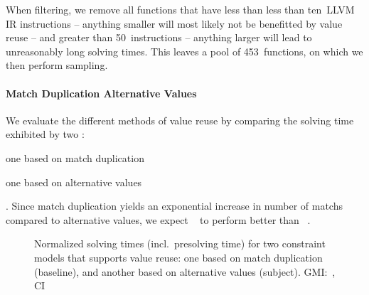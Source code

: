 When filtering, we remove all \glspl{function} that have less than less
than ten~\gls{LLVM} \gls{IR} \glspl{instruction} -- anything smaller will most
likely not be benefitted by \gls{value reuse} -- and greater than
\num{50}~\glspl{instruction} -- anything larger will lead to unreasonably long
solving times.
%
This leaves a pool of \num{453}~\glspl{function}, on which we then perform
sampling.


\paragraph{Match Duplication \versus Alternative Values}

We evaluate the different methods of \gls{value reuse} by comparing the solving
time exhibited by two :
%
\begin{modelList}
  \item {}
    one based on \gls{match duplication}
  \item {}
    one based on \glspl{alternative value}
\end{modelList}.
%
Since \gls{match duplication} yields an exponential increase in number of
\glspl{match} compared to \glspl{alternative value}, we expect
~ to perform better than
~.



\begin{figure}
  \centering%
  \maxsizebox{\textwidth}{!}{%
    \trimBarchartPlot{%
    }%
  }

  \caption[%
            Plot for evaluating match duplication's and alternative values'
            impact on solving time%
          ]%
          {%
            Normalized solving times (incl.\ presolving time) for two
            constraint models that supports value reuse: one based on match
            duplication (baseline), and another based on alternative values
            (subject).
            GMI:~\printGMI{%
              \AltValuesVsMatchDupPrePlusSolvingTimeSpeedupPrePlusSolvingTimeRegularSpeedupGmean%
            },
            CI~\printGMICI{%
              \AltValuesVsMatchDupPrePlusSolvingTimeSpeedupPrePlusSolvingTimeRegularSpeedupCiMin%
            }{%
              \AltValuesVsMatchDupPrePlusSolvingTimeSpeedupPrePlusSolvingTimeRegularSpeedupCiMax%
            }%
          }
\end{figure}


